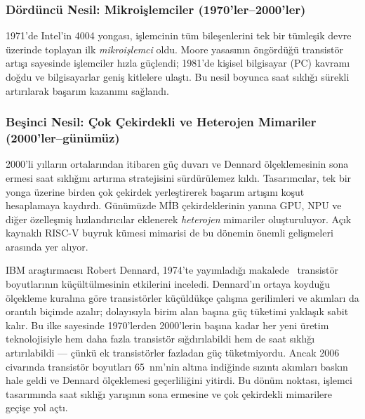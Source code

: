 \subsubsection*{Dördüncü Nesil: Mikroişlemciler (1970'ler--2000'ler)}
1971'de Intel'in 4004 yongası, işlemcinin tüm bileşenlerini tek bir tümleşik devre üzerinde toplayan ilk \emph{mikroişlemci} oldu. Moore yasasının öngördüğü transistör artışı sayesinde işlemciler hızla güçlendi; 1981'de kişisel bilgisayar (PC) kavramı doğdu ve bilgisayarlar geniş kitlelere ulaştı. Bu nesil boyunca saat sıklığı sürekli artırılarak başarım kazanımı sağlandı.

\subsubsection*{Beşinci Nesil: Çok Çekirdekli ve Heterojen Mimariler (2000'ler--günümüz)}
2000'li yılların ortalarından itibaren güç duvarı ve Dennard ölçeklemesinin sona ermesi saat sıklığını artırma stratejisini sürdürülemez kıldı. Tasarımcılar, tek bir yonga üzerine birden çok çekirdek yerleştirerek başarım artışını koşut hesaplamaya kaydırdı. Günümüzde MİB çekirdeklerinin yanına GPU, NPU ve diğer özelleşmiş hızlandırıcılar eklenerek \emph{heterojen} mimariler oluşturuluyor. Açık kaynaklı RISC-V buyruk kümesi mimarisi de bu dönemin önemli gelişmeleri arasında yer alıyor.

\begin{bilginot}
IBM araştırmacısı Robert Dennard, 1974'te yayımladığı makalede~\cite{dennard1974} transistör boyutlarının küçültülmesinin etkilerini inceledi. Dennard'ın ortaya koyduğu ölçekleme kuralına göre transistörler küçüldükçe çalışma gerilimleri ve akımları da orantılı biçimde azalır; dolayısıyla birim alan başına güç tüketimi yaklaşık sabit kalır. Bu ilke sayesinde 1970'lerden 2000'lerin başına kadar her yeni üretim teknolojisiyle hem daha fazla transistör sığdırılabildi hem de saat sıklığı artırılabildi --- çünkü ek transistörler fazladan güç tüketmiyordu. Ancak 2006 civarında transistör boyutları 65~nm'nin altına indiğinde sızıntı akımları baskın hale geldi ve Dennard ölçeklemesi geçerliliğini yitirdi. Bu dönüm noktası, işlemci tasarımında saat sıklığı yarışının sona ermesine ve çok çekirdekli mimarilere geçişe yol açtı.
\end{bilginot}

